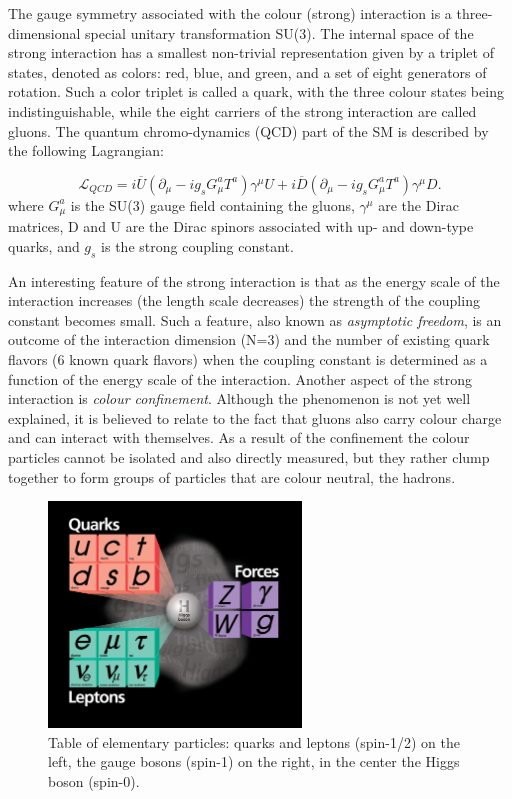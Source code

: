 The gauge symmetry associated with the colour (strong) interaction is a three-dimensional special
unitary transformation SU(3). The internal space of the strong interaction has a smallest
non-trivial representation given by a triplet of states, denoted as colors: red, blue, and green,
and a set of eight generators of rotation. Such a color triplet is called a quark, with the
three colour states being indistinguishable, while the
eight carriers of the strong interaction are called gluons. 
The quantum chromo-dynamics (QCD)
part of the SM is described by the following Lagrangian:

\begin{equation}
\mathcal{L}_{QCD} = i\overline U (\partial_\mu-ig_sG_\mu^a T^a)\gamma^\mu U + i\overline D (\partial_\mu-i g_s G_\mu^a T^a)\gamma^\mu D.
\label{eqn:LagrQCD}
\end{equation}
where $G_\mu^a$ is the SU(3) gauge field containing the gluons, $\gamma^\mu$ are the Dirac matrices,
 D and U are the Dirac spinors associated with up- and down-type quarks, and $g_s$ 
is the strong coupling constant.

An interesting feature of the strong interaction is that as the energy scale of the interaction 
increases (the length scale decreases) the strength of the coupling constant becomes small.
Such a feature, also known as {\it asymptotic freedom},
 is an outcome of the interaction dimension (N=3) and the number of existing
quark flavors (6 known quark flavors) when the coupling constant is determined as a function
of the energy scale of the interaction.
 Another aspect of the strong interaction is {\it colour
confinement}. Although the phenomenon is not yet well explained, it is believed to
 relate to the fact that gluons also carry colour charge and can interact
with themselves. As a result of the confinement the colour particles 
cannot be isolated and also directly measured, 
but they rather clump together to form groups of particles that are colour neutral, the hadrons.

\begin{figure}
\centering
\includegraphics[width=0.6\textwidth]{plots/intro/Higgs_SM.jpeg}
\caption{Table of elementary particles: quarks and leptons (spin-1/2) on the left,
the gauge bosons (spin-1) on the right, in the center the Higgs boson (spin-0).
\label{fig:parttable}}

\end{figure}


